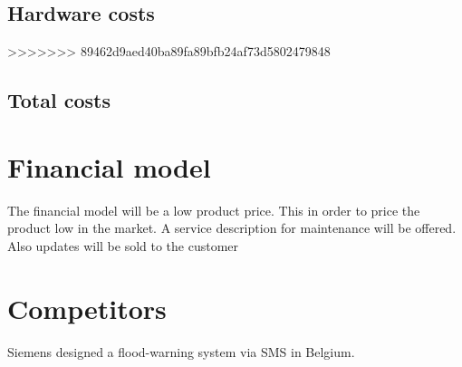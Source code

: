 \subsection{Hardware costs}
>>>>>>> 89462d9aed40ba89fa89bfb24af73d5802479848

\subsection{Total costs}


\section{Financial model}
The financial model will be a low product price. This in order to price the product low in the market. A service description for maintenance will be offered. Also updates will be sold to the customer

\section{Competitors}
Siemens designed a flood-warning system via SMS in Belgium.

